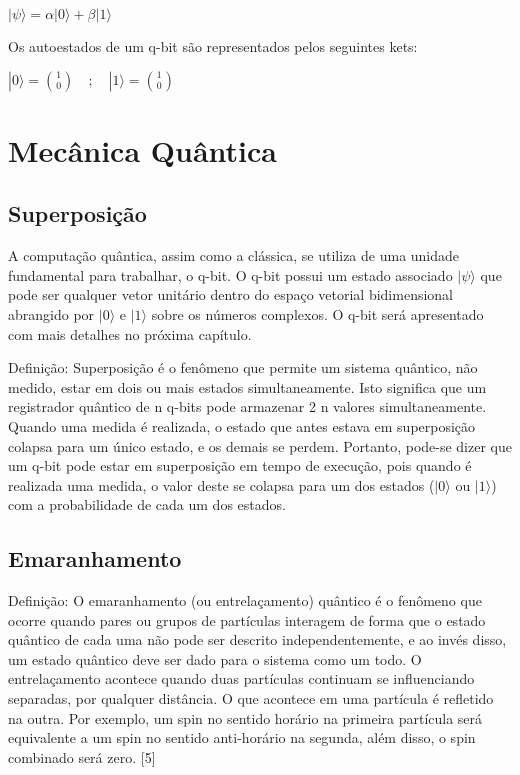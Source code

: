 \documentclass[12pt, a4paper, oneside]{article}
\begin{document}
\begin{center}
$ | \psi \rangle = 	\alpha | 0 \rangle  +  \beta | 1 \rangle $
\end{center} 

\noindent Os autoestados de um q-bit são representados pelos seguintes kets:

\begin{center}
$ | 0 \rangle = 	{1 \choose 0} \quad ; \quad | 1 \rangle = {1 \choose 0} $
\end{center} 




\section{Mecânica Quântica}

\subsection{Superposição}

\par A computação quântica, assim como a clássica, se utiliza de uma unidade fundamental
para trabalhar, o q-bit. O q-bit possui um estado associado $| \psi \rangle$ que pode ser qualquer vetor
unitário dentro do espaço vetorial bidimensional abrangido por $| 0 \rangle$ e $| 1 \rangle $ sobre os números
complexos. O q-bit será apresentado com mais detalhes no próxima capítulo.\\
\par Definição: Superposição é o fenômeno que permite um sistema quântico, não medido,
estar em dois ou mais estados simultaneamente.
Isto significa que um registrador quântico de n q-bits pode armazenar 2 n valores simultaneamente. Quando uma medida é realizada, o estado que antes estava em superposição
colapsa para um único estado, e os demais se perdem. Portanto, pode-se dizer que um q-bit
pode estar em superposição em tempo de execução, pois quando é realizada uma medida, o valor deste se colapsa para um dos estados ($| 0 \rangle$ ou $| 1 \rangle$) com a probabilidade de cada um dos
estados.

\subsection{Emaranhamento}

\par Definição: O emaranhamento (ou entrelaçamento) quântico é o fenômeno que ocorre
quando pares ou grupos de partículas interagem de forma que o estado quântico de cada uma
não pode ser descrito independentemente, e ao invés disso, um estado quântico deve ser dado
para o sistema como um todo.
O entrelaçamento acontece quando duas partículas continuam se influenciando separadas,
por qualquer distância. O que acontece em uma partícula é refletido na outra. Por exemplo,
um spin no sentido horário na primeira partícula será equivalente a um spin no sentido
anti-horário na segunda, além disso, o spin combinado será zero. [5]
\end{document}
